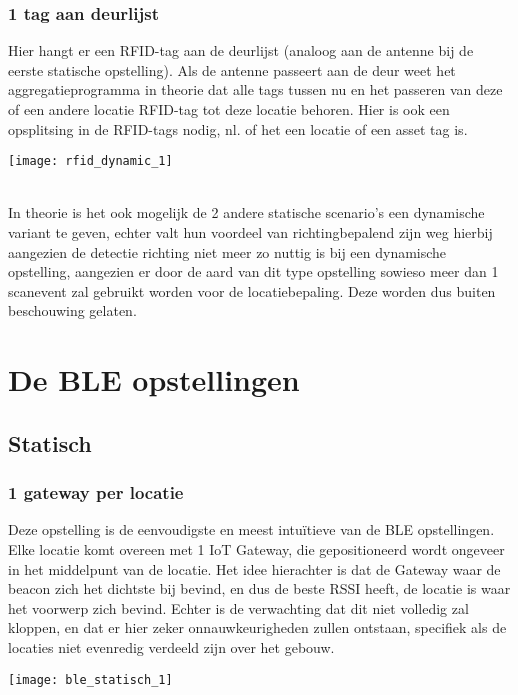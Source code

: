 \subsubsection{1 tag aan deurlijst}
\begin{minipage}{0.65\textwidth}
Hier hangt er een RFID-tag aan de deurlijst (analoog aan de antenne bij de eerste statische opstelling). Als de antenne passeert aan de deur weet het aggregatieprogramma in theorie dat alle tags tussen nu en het passeren van deze of een andere locatie RFID-tag tot deze locatie behoren. Hier is ook een opsplitsing in de RFID-tags nodig, nl. of het een locatie of een asset tag is.
\end{minipage}
\hfill
\begin{minipage}{0.30\textwidth}
	\texttt{[image: rfid\_dynamic\_1]}
\end{minipage}
\\[200pt]
In theorie is het ook mogelijk de 2 andere statische scenario's een dynamische variant te geven, echter valt hun voordeel van richtingbepalend zijn weg hierbij aangezien de detectie richting niet meer zo nuttig is bij een dynamische opstelling, aangezien er door de aard van dit type opstelling sowieso meer dan 1 scanevent zal gebruikt worden voor de locatiebepaling. Deze worden dus buiten beschouwing gelaten.


\section[BLE]{De BLE opstellingen}
\label{ch:ble}

\subsection{Statisch}

\subsubsection{1 gateway per locatie}
\begin{minipage}{0.65\textwidth}
Deze opstelling is de eenvoudigste en meest intuïtieve van de BLE opstellingen. Elke locatie komt overeen met 1 IoT Gateway, die gepositioneerd wordt ongeveer in het middelpunt van de locatie. Het idee hierachter is dat de Gateway waar de beacon zich het dichtste bij bevind, en dus de beste RSSI heeft, de locatie is waar het voorwerp zich bevind. Echter is de verwachting dat dit niet volledig zal kloppen, en dat er hier zeker onnauwkeurigheden zullen ontstaan, specifiek als de locaties niet evenredig verdeeld zijn over het gebouw.
\end{minipage}
\hfill
\begin{minipage}{0.30\textwidth}
	\texttt{[image: ble\_statisch\_1]}
\end{minipage}

